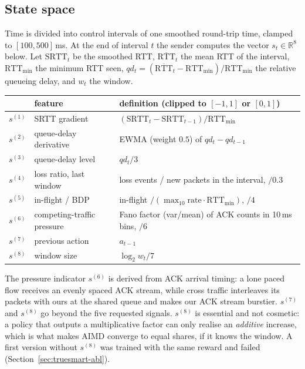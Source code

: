\subsection{State space}
Time is divided into control intervals of one smoothed round-trip time, clamped to $[100,500]$\,ms. At the end of interval $t$ the sender computes the vector $s_t\in\mathbb{R}^8$ below. Let $\mathrm{SRTT}_t$ be the smoothed RTT, $\overline{\mathrm{RTT}}_t$ the mean RTT of the interval, $\mathrm{RTT}_{\min}$ the minimum RTT seen, $qd_t=(\overline{\mathrm{RTT}}_t-\mathrm{RTT}_{\min})/\mathrm{RTT}_{\min}$ the relative queueing delay, and $w_t$ the window.
\begin{center}\footnotesize
\setlength{\tabcolsep}{3pt}
\begin{tabular}{@{}cp{2.7cm}p{4.3cm}@{}}
\toprule
 & feature & definition (clipped to $[-1,1]$ or $[0,1]$)\\
\midrule
$s^{(1)}$ & SRTT gradient & $(\mathrm{SRTT}_t-\mathrm{SRTT}_{t-1})/\mathrm{RTT}_{\min}$\\
$s^{(2)}$ & queue-delay derivative & EWMA (weight $0.5$) of $qd_t-qd_{t-1}$\\
$s^{(3)}$ & queue-delay level & $qd_t/3$\\
$s^{(4)}$ & loss ratio, last window & loss events / new packets in the interval, $/0.3$\\
$s^{(5)}$ & in-flight / BDP & in-flight $/(\max_{10}\text{rate}\cdot\mathrm{RTT}_{\min})$, $/4$\\
$s^{(6)}$ & competing-traffic pressure & Fano factor (var/mean) of ACK counts in 10\,ms bins, $/6$\\
$s^{(7)}$ & previous action & $a_{t-1}$\\
$s^{(8)}$ & window size & $\log_2 w_t/7$\\
\bottomrule
\end{tabular}
\end{center}
The pressure indicator $s^{(6)}$ is derived from ACK arrival timing: a lone paced flow receives an evenly spaced ACK stream, while cross traffic interleaves its packets with ours at the shared queue and makes our ACK stream burstier. $s^{(7)}$ and $s^{(8)}$ go beyond the five requested signals. $s^{(8)}$ is essential and not cosmetic: a policy that outputs a multiplicative factor can only realise an \emph{additive} increase, which is what makes AIMD converge to equal shares, if it knows the window. A first version without $s^{(8)}$ was trained with the same reward and failed (Section~\ref{sec:truesmart-abl}).


